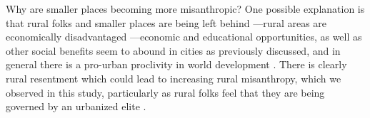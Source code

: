 \documentclass[11pt, letterpaper]{article}
\begin{document}
\begin{spacing}{1.4}
Why are smaller places becoming more misanthropic? One possible explanation is that rural folks and smaller places are being left behind \citep{fullerNYT17monD,hansonCityJournalautumn15,aok-misanthropy-trustCity,aok-swbGenYcity18,aokCityBook15}---rural areas are economically disadvantaged \citep{glaeser11,osullivan09,florida21}---economic and educational opportunities, as well as other social benefits seem to abound in cities as previously discussed, and in general there is a pro-urban proclivity in world development \citep{lipton77}. There is clearly rural resentment which could lead to increasing rural misanthropy, which we observed in this study, 
  particularly as rural folks feel that they are being governed by an urbanized elite \citep{wuthnow18,fullerNYT17monD}. %


\end{spacing}
\end{document}

